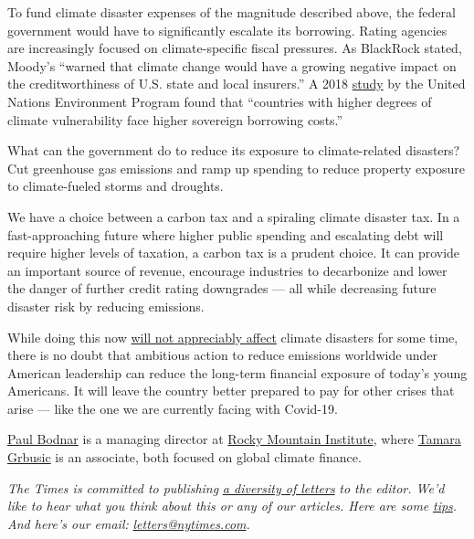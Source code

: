 To fund climate disaster expenses of the magnitude described above, the
federal government would have to significantly escalate its borrowing.
Rating agencies are increasingly focused on climate-specific fiscal
pressures. As BlackRock stated, Moody's ``warned that climate change
would have a growing negative impact on the creditworthiness of U.S.
state and local insurers.'' A 2018
\href{http://wedocs.unep.org/bitstream/handle/20.500.11822/26007/Climate_Change_Costs.pdf?sequence=1\&isAllowed=y}{study}
by the United Nations Environment Program found that ``countries with
higher degrees of climate vulnerability face higher sovereign borrowing
costs.''

What can the government do to reduce its exposure to climate-related
disasters? Cut greenhouse gas emissions and ramp up spending to reduce
property exposure to climate-fueled storms and droughts.

We have a choice between a carbon tax and a spiraling climate disaster
tax. In a fast-approaching future where higher public spending and
escalating debt will require higher levels of taxation, a carbon tax is
a prudent choice. It can provide an important source of revenue,
encourage industries to decarbonize and lower the danger of further
credit rating downgrades --- all while decreasing future disaster risk
by reducing emissions.

While doing this now
\href{https://earthobservatory.nasa.gov/features/HeatBucket/heatbucket4.php}{will
not appreciably affect} climate disasters for some time, there is no
doubt that ambitious action to reduce emissions worldwide under American
leadership can reduce the long-term financial exposure of today's young
Americans. It will leave the country better prepared to pay for other
crises that arise --- like the one we are currently facing with
Covid-19.

\href{https://rmi.org/people/paul-bodnar/}{Paul Bodnar} is a managing
director at \href{https://rmi.org/}{Rocky Mountain Institute}, where
\href{https://rmi.org/people/tamara-grbusic/}{Tamara Grbusic} is an
associate, both focused on global climate finance.

\emph{The Times is committed to publishing}
\href{https://www.nytimes.com/2019/01/31/opinion/letters/letters-to-editor-new-york-times-women.html}{\emph{a
diversity of letters}} \emph{to the editor. We'd like to hear what you
think about this or any of our articles. Here are some}
\href{https://help.nytimes.com/hc/en-us/articles/115014925288-How-to-submit-a-letter-to-the-editor}{\emph{tips}}\emph{.
And here's our email:}
\href{mailto:letters@nytimes.com}{\emph{letters@nytimes.com}}\emph{.}

